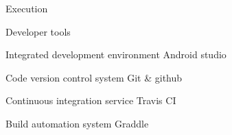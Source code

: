 \chap Execution

\sec Developer tools

\secc Integrated development environment
Android studio

\secc Code version control system
Git \& github

\secc Continuous integration service
Travis CI

\secc Build automation system
Graddle
